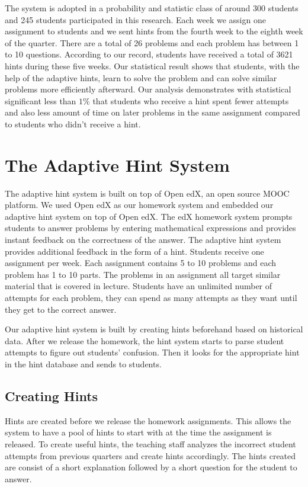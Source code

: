 \documentclass{llncs2e/llncs}
\begin{document}
The system is adopted in a probability and statistic class of around 300 students and 245 students participated in this research. Each week we assign one assignment to students and we sent hints from the fourth week to the eighth week of the quarter. There are a total of 26 problems and each problem has between 1 to 10 questions. According to our record, students have received a total of 3621 hints during these five weeks. Our statistical result shows that students, with the help of the adaptive hints, learn to solve the problem and can solve similar problems more efficiently afterward. Our analysis demonstrates with statistical significant less than $1\%$ that students who receive a hint spent fewer attempts and also less amount of time on later problems in the same assignment compared to students who didn't receive a hint.


\section{The Adaptive Hint System}
The adaptive hint system is built on top of Open edX, an open source MOOC platform. We used Open edX as our homework system and embedded our adaptive hint system on top of Open edX. The edX homework system prompts students to answer problems by entering mathematical expressions and provides instant feedback on the correctness of the answer. The adaptive hint system provides additional feedback in the form of a hint. Students receive one assignment per week. Each assignment contains 5 to 10 problems and each problem has 1 to 10 parts. The problems in an assignment all target similar material that is covered in lecture. Students have an unlimited number of attempts for each problem, they can spend as many attempts as they want until they get to the correct answer.

Our adaptive hint system is built by creating hints beforehand based on historical data. After we release the homework, the hint system starts to parse student attempts to figure out students' confusion. Then it looks for the appropriate hint in the hint database and sends to students.


\subsection*{Creating Hints}

Hints are created before we release the homework assignments. This allows the system to have a pool of hints to start with at the time the assignment is released. To create useful hints, the teaching staff analyzes the incorrect student attempts from previous quarters and create hints accordingly. The hints created are consist of a short explanation followed by a short question for the student to answer.
\end{document}
